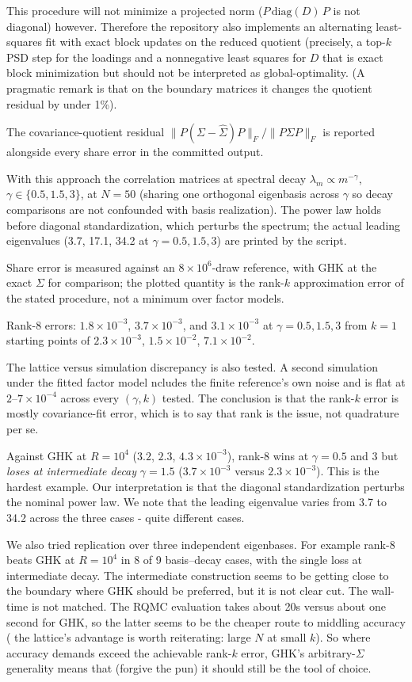 \documentclass[12pt]{article}
\theoremstyle{remark}
\begin{document}
This procedure will not minimize a projected norm ($P\,\mathrm{diag}(D)\,P$
is not diagonal) however. Therefore the repository also implements an alternating least-squares fit with
exact block updates on the reduced quotient (precisely, a top-$k$ PSD step for the
loadings and a nonnegative least squares for $D$ that is exact block minimization but should not be interpreted as 
global-optimality.  (A pragmatic remark is that on the boundary matrices it changes the
quotient residual by under 1\%).

The covariance-quotient residual $\|P(\Sigma -
\hat\Sigma)P\|_F / \|P\Sigma P\|_F$ is reported alongside every share
error in the committed output.

With this approach the correlation matrices at spectral decay $\lambda_m \propto
m^{-\gamma}$, $\gamma \in \{0.5, 1.5, 3\}$, at $N=50$ (sharing one
orthogonal eigenbasis across $\gamma$ so decay comparisons are not
confounded with basis realization). The power law holds before diagonal
standardization, which perturbs the spectrum; the actual leading eigenvalues
(3.7, 17.1, 34.2 at $\gamma = 0.5, 1.5, 3$) are printed by the script.

Share error is measured against an $8\times10^6$-draw reference, with GHK
at the exact $\Sigma$ for comparison; the plotted quantity is the rank-$k$
approximation error of the stated procedure, not a minimum over factor
models.

Rank-8 errors: $1.8\times10^{-3}$, $3.7\times10^{-3}$, and
$3.1\times10^{-3}$ at $\gamma = 0.5, 1.5, 3$ from $k=1$ starting points of
$2.3\times10^{-3}$, $1.5\times10^{-2}$, $7.1\times10^{-2}$.

The lattice versus simulation discrepancy is also tested. A second simulation under the fitted factor model ncludes the finite
reference's own noise and is flat at $2$--$7\times10^{-4}$ across every $(\gamma,
k)$ tested. The conclusion is that the rank-$k$ error is mostly covariance-fit error, which is to say that 
rank is the issue, not quadrature per se. 

Against GHK at $R = 10^4$
($3.2$, $2.3$, $4.3\times10^{-3}$), rank-8 wins at $\gamma = 0.5$ and $3$
but \emph{loses at intermediate decay} $\gamma = 1.5$
($3.7\times10^{-3}$ versus $2.3\times10^{-3}$). This is the hardest example. 
Our interpretation is that the diagonal standardization 
perturbs the nominal power law. We note that the leading eigenvalue varies from 3.7 to 34.2
across the three cases - quite different cases. 

We also tried replication over three independent eigenbases. For example rank-8 beats GHK at $R=10^4$
in 8 of 9 basis--decay cases, with the single loss at intermediate decay.
The intermediate construction seems to be getting close to the boundary where  GHK should be preferred, but 
it is not clear cut. The wall-time is not matched. The RQMC evaluation takes about 20s versus
about one second for GHK, so the latter seems to be the cheaper route to middling accuracy ( 
the lattice's advantage is worth reiterating: large $N$ at small $k$). So where accuracy demands exceed the achievable rank-$k$
error, GHK's arbitrary-$\Sigma$ generality means that (forgive the pun) it should still be the tool of choice.  
\end{document}
